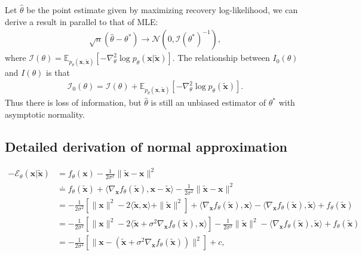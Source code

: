 \documentclass{article} \usepackage{iclr2021_conference,times}
\def\rvx{{\mathbf{x}}}
\newcommand{\E}{\mathbb{E}}
\def\N{{\mathcal N}}
\def\trvx{\tilde{\rvx}}
\begin{document}
Let $\hat{\theta}$ be the point estimate given by maximizing recovery log-likelihood, we can derive a result in parallel to that of MLE:
\begin{eqnarray}
	\sqrt{n} (\hat{\theta} - \theta^*) \to \N(0, \mathcal{I}(\theta^*)^{-1}),
\end{eqnarray}
where $\mathcal{I}(\theta) = \E_{p_{\theta}(\rvx, \trvx)} [ - \nabla^2_\theta \log p_\theta(\rvx|\trvx) ]$. 
The relationship between $I_0(\theta)$ and $I(\theta)$ is that
\begin{eqnarray} 
   \mathcal{I}_0(\theta) = \mathcal{I}(\theta) +  \E_{p_{\theta}(\rvx, \trvx)} [ - \nabla^2_\theta \log p_\theta(\trvx) ].
 \end{eqnarray}
 Thus there is loss of information, but $\hat{\theta}$ is still an unbiased estimator of $\theta^*$ with asymptotic normality. 
 
 
 \subsection{Detailed derivation of normal approximation} \label{app:normal}
 \begin{align} 
 - \mathcal{E}_\theta(\rvx|\trvx) &=   f_\theta(\rvx) - \frac{1}{2\sigma^2} \|\trvx-\rvx\|^2 \\
        &\doteq f_\theta(\trvx) + \langle \nabla_\rvx f_\theta(\trvx), \rvx-\trvx\rangle  - \frac{1}{2\sigma^2} \|\trvx-\rvx\|^2\\  
        & = -\frac{1}{2\sigma^2} \left[ \|\rvx\|^2 - 2 \langle \trvx, \rvx \rangle + \|\trvx\|^2 \right] + \langle \nabla_\rvx f_\theta(\trvx), \rvx \rangle - \langle \nabla_\rvx f_\theta(\trvx), \trvx \rangle + f_\theta(\trvx) \\
        & = -\frac{1}{2\sigma^2} \left[ \|\rvx\|^2 - 2\langle\trvx + \sigma^2\nabla_\rvx f_\theta(\trvx), \rvx \rangle \right] - \frac{1}{2\sigma^2} \|\trvx\|^2 - \langle \nabla_\rvx f_\theta(\trvx), \trvx \rangle + f_\theta(\trvx) \\
        &= - \frac{1}{2\sigma^2} \left[ \|\rvx - (\trvx + \sigma^2 \nabla_\rvx f_\theta(\trvx))\|^2\right] + c,
\end{align}
 
\end{document}
